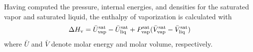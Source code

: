 \documentclass[journal=jced,manuscript=article]{achemso}
\begin{document}

Having computed the pressure, internal energies, and densities for the saturated vapor and saturated liquid, the enthalpy of vaporization is calculated with
\begin{equation}
\Delta H_{\rm v} = \bar U_{\rm vap}^{\rm sat} - \bar U_{\rm liq}^{\rm sat} + P_{\rm vap}^{\rm sat} (\bar V_{\rm vap}^{\rm sat} - \bar V_{\rm liq}^{\rm sat})
\end{equation}
where $\bar U$ and $\bar V$ denote molar energy and molar volume, respectively.

\end{document}
